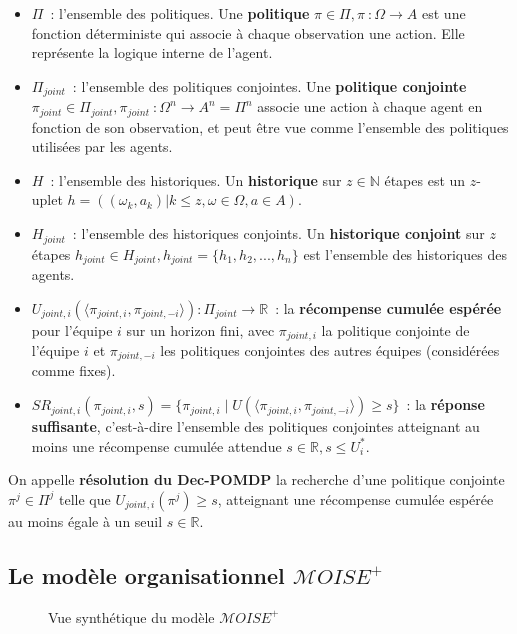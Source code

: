 \documentclass[francais,ROIA,Unicode,manuscript]{cedram}
\begin{document}
\begin{itemize}
    \item $\Pi$~: l'ensemble des politiques. Une \textbf{politique} $\pi \in \Pi, \pi~: \Omega \rightarrow A$ est une fonction déterministe qui associe à chaque observation une action. Elle représente la logique interne de l'agent.
    \item $\Pi_{joint}$~: l'ensemble des politiques conjointes. Une \textbf{politique conjointe} $\pi_{joint} \in \Pi_{joint}, \pi_{joint}~: \Omega^n \rightarrow A^n = \Pi^n$ associe une action à chaque agent en fonction de son observation, et peut être vue comme l'ensemble des politiques utilisées par les agents.
    \item $H$~: l'ensemble des historiques. Un \textbf{historique} sur $z \in \mathbb{N}$ étapes est un $z$-uplet $h = ((\omega_k, a_k) | k \leq z, \omega \in \Omega, a \in A)$.
    \item $H_{joint}$~: l'ensemble des historiques conjoints. Un \textbf{historique conjoint} sur $z$ étapes $h_{joint} \in H_{joint}, h_{joint} = \{h_1, h_2, ..., h_n\}$ est l'ensemble des historiques des agents.
    \item $U_{joint,i}(\langle \pi_{joint,i}, \pi_{joint,-i} \rangle): \Pi_{joint} \rightarrow \mathbb{R}$~: la \textbf{récompense cumulée espérée} pour l'équipe $i$ sur un horizon fini, avec $\pi_{joint,i}$ la politique conjointe de l'équipe $i$ et $\pi_{joint,-i}$ les politiques conjointes des autres équipes (considérées comme fixes).
    \item $SR_{joint,i}(\pi_{joint,i}, s) = \{\pi_{joint,i} \mid U(\langle \pi_{joint,i}, \pi_{joint,-i} \rangle) \geq s\}$~: la \textbf{réponse suffisante}, c'est-à-dire l'ensemble des politiques conjointes atteignant au moins une récompense cumulée attendue $s \in \mathbb{R}, s \leq U^*_i$.
\end{itemize}

On appelle \textbf{résolution du Dec-POMDP} la recherche d'une politique conjointe $\pi^j \in \Pi^j$ telle que $U_{joint,i}(\pi^j) \geq s$, atteignant une récompense cumulée espérée au moins égale à un seuil $s \in \mathbb{R}$.

\subsection{Le modèle organisationnel $\mathcal{M}OISE^+$}

\begin{figure}[h!]
    \centering
    
    \caption{Vue synthétique du modèle $\mathcal{M}OISE^+$}
    \label{fig:moise_model}
\end{figure}
\end{document}
